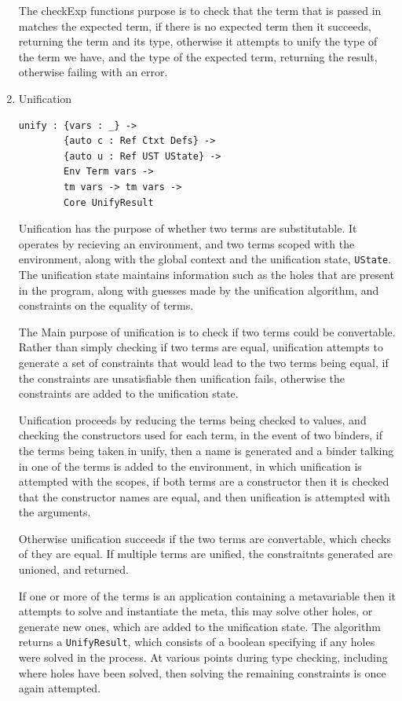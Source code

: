 \documentclass[a4paper]{article}
\begin{document}
\begin{enumerate}
The checkExp functions purpose is to check that the term that is passed
in matches the expected term, if there is no expected term then it 
succeeds, returning the term and its type, otherwise it attempts to 
unify the type of the term we have, and the type of the expected term, 
returning the result, otherwise failing with an error. 

\item Unification
\label{sec:org1851c6e}

\begin{center}
\begin{verbatim}
unify : {vars : _} ->
		{auto c : Ref Ctxt Defs} ->
		{auto u : Ref UST UState} ->
		Env Term vars ->
		tm vars -> tm vars ->
		Core UnifyResult
\end{verbatim}
\end{center}
Unification has the purpose of whether two terms are substitutable. 
It operates by recieving an environment, and two terms scoped 
with the environment, along with the global context and the unification
state, \texttt{UState}. The unification state maintains information such as 
the holes that are present in the program, along with guesses made by 
the unification algorithm, and constraints on the equality of terms.

The Main purpose of unification is to check if two terms could be 
convertable. Rather than simply checking if two terms are equal, 
unification attempts to generate a set of constraints that would lead 
to the two terms being equal, if the constraints are unsatisfiable then
unification fails, otherwise the constraints are added to the
unification state. 

Unification proceeds by reducing the terms being checked to values, and
checking the constructors used for each term, in the event of two binders, 
if the terms being taken in unify, then a name is generated and a 
binder talking in one of the terms is added to the environment, in which
unification is attempted with the scopes, if both terms are a constructor
then it is checked that the constructor names are equal, and then unification
is attempted with the arguments. 

Otherwise unification succeeds if the two terms are convertable, which
checks of they are equal. If multiple terms are unified, the constraitnts 
generated are unioned, and returned.  

If one or more of the terms is an application containing a metavariable
then it attempts to solve and instantiate the meta, this may solve other 
holes, or generate new ones, which are added to the unification state. 
The algorithm returns a \texttt{UnifyResult}, which consists of a boolean 
specifying if any holes were solved in the process. At various points 
during type checking, including where holes have been solved, then 
solving the remaining constraints is once again attempted. 


\end{enumerate}
\end{document}
